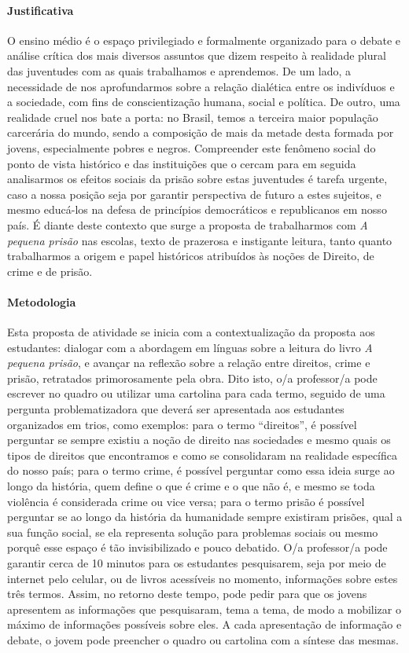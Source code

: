 \documentclass[11pt]{extarticle}
\begin{document}
\paragraph{Justificativa} O ensino médio é o espaço privilegiado e
formalmente organizado para o debate e análise crítica dos mais diversos
assuntos que dizem respeito à realidade plural das juventudes com as
quais trabalhamos e aprendemos. De um lado, a necessidade de nos
aprofundarmos sobre a relação dialética entre os indivíduos e a
sociedade, com fins de conscientização humana, social e política. De
outro, uma realidade cruel nos bate a porta: no Brasil, temos a terceira
maior população carcerária do mundo, sendo a composição de mais da
metade desta formada por jovens, especialmente pobres e negros.
Compreender este fenômeno social do ponto de vista histórico e das
instituições que o cercam para em seguida analisarmos os efeitos sociais
da prisão sobre estas juventudes é tarefa urgente, caso a nossa posição
seja por garantir perspectiva de futuro a estes sujeitos, e mesmo
educá-los na defesa de princípios democráticos e republicanos em nosso
país. É diante deste contexto que surge a proposta de trabalharmos com
\emph{A pequena prisão} nas escolas, texto de prazerosa e instigante
leitura, tanto quanto trabalharmos a origem e papel históricos
atribuídos às noções de Direito, de crime e de prisão.

\paragraph{Metodologia} Esta proposta de atividade se inicia com a
contextualização da proposta aos estudantes: dialogar com a abordagem em
línguas sobre a leitura do livro \emph{A pequena prisão}, e avançar na
reflexão sobre a relação entre direitos, crime e prisão, retratados
primorosamente pela obra. Dito isto, o/a professor/a pode escrever no
quadro ou utilizar uma cartolina para cada termo, seguido de uma
pergunta problematizadora que deverá ser apresentada aos estudantes
organizados em trios, como exemplos: para o termo ``direitos'', é
possível perguntar se sempre existiu a noção de direito nas sociedades e
mesmo quais os tipos de direitos que encontramos e como se consolidaram
na realidade específica do nosso país; para o termo crime, é possível
perguntar como essa ideia surge ao longo da história, quem define o que
é crime e o que não é, e mesmo se toda violência é considerada crime ou
vice versa; para o termo prisão é possível perguntar se ao longo da
história da humanidade sempre existiram prisões, qual a sua função
social, se ela representa solução para problemas sociais ou mesmo porquê
esse espaço é tão invisibilizado e pouco debatido. O/a professor/a pode
garantir cerca de 10 minutos para os estudantes pesquisarem, seja por
meio de internet pelo celular, ou de livros acessíveis no momento,
informações sobre estes três termos. Assim, no retorno deste tempo, pode
pedir para que os jovens apresentem as informações que pesquisaram, tema
a tema, de modo a mobilizar o máximo de informações possíveis sobre
eles. A cada apresentação de informação e debate, o jovem pode preencher
o quadro ou cartolina com a síntese das mesmas.
\end{document}
